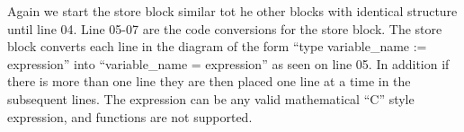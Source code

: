 Again we start the store block similar tot he other blocks with identical structure until line 04. Line 05-07 are the code conversions for the store block. The store block converts each line in the diagram of the form ``type variable\_name := expression'' into ``variable\_name = expression'' as seen on line 05. In addition if there is more than one line they are then placed one line at a time in the subsequent lines. The expression can be any valid mathematical ``C'' style expression, and functions are not supported.